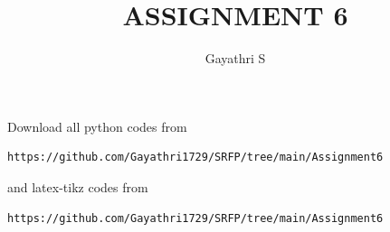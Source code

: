 \documentclass[journal,12pt,twocolumn]{IEEEtran}
\begin{document}
%


\newtheorem{theorem}{Theorem}[section]
\newtheorem{problem}{Problem}
\newtheorem{proposition}{Proposition}[section]
\newtheorem{lemma}{Lemma}[section]
\newtheorem{corollary}[theorem]{Corollary}
\newtheorem{example}{Example}[section]
\newtheorem{definition}[problem]{Definition}
\newcommand{\BEQA}{\begin{eqnarray}}
\newcommand{\EEQA}{\end{eqnarray}}
\newcommand{\define}{\stackrel{\triangle}{=}}

\providecommand{\mbf}{\mathbf}
\providecommand{\pr}[1]{\ensuremath{\Pr\left(#1\right)}}
\providecommand{\qfunc}[1]{\ensuremath{Q\left(#1\right)}}
\providecommand{\sbrak}[1]{\ensuremath{{}\left[#1\right]}}
\providecommand{\lsbrak}[1]{\ensuremath{{}\left[#1\right.}}
\providecommand{\rsbrak}[1]{\ensuremath{{}\left.#1\right]}}
\providecommand{\brak}[1]{\ensuremath{\left(#1\right)}}
\providecommand{\lbrak}[1]{\ensuremath{\left(#1\right.}}
\providecommand{\rbrak}[1]{\ensuremath{\left.#1\right)}}
\providecommand{\cbrak}[1]{\ensuremath{\left\{#1\right\}}}
\providecommand{\lcbrak}[1]{\ensuremath{\left\{#1\right.}}
\providecommand{\rcbrak}[1]{\ensuremath{\left.#1\right\}}}
\theoremstyle{remark}
\newtheorem{rem}{Remark}
\newcommand{\sgn}{\mathop{\mathrm{sgn}}}
\providecommand{\abs}[1]{\left\vert#1\right\vert}
\providecommand{\res}[1]{\Res\displaylimits_{#1}} 
\providecommand{\norm}[1]{\left\lVert#1\right\rVert}
\providecommand{\mtx}[1]{\mathbf{#1}}
\providecommand{\mean}[1]{E\left[ #1 \right]}
\providecommand{\fourier}{\overset{\mathcal{F}}{ \rightleftharpoons}}
\providecommand{\system}{\overset{\mathcal{H}}{ \longleftrightarrow}}


\newcommand{\myvec}[1]{\ensuremath{\begin{pmatrix}#1\end{pmatrix}}}
\newcommand{\cmyvec}[1]{\ensuremath{\begin{pmatrix*}[c]#1\end{pmatrix*}}}
\newcommand{\mydet}[1]{\ensuremath{\begin{vmatrix}#1\end{vmatrix}}}
\newcommand{\proj}[2]{\textbf{proj}_{\vec{#1}}\vec{#2}}
\let\StandardTheFigure\thefigure
\let\vec\mathbf
\title{
ASSIGNMENT 6
}
\author{Gayathri S}
	

\maketitle
\renewcommand{\thefigure}{\theenumi}
\renewcommand{\thetable}{\theenumi}
  Download all python codes from 
\begin{lstlisting}
https://github.com/Gayathri1729/SRFP/tree/main/Assignment6
\end{lstlisting}
%
and latex-tikz codes from 
%
\begin{lstlisting}
https://github.com/Gayathri1729/SRFP/tree/main/Assignment6
\end{lstlisting}
%
\end{document}
